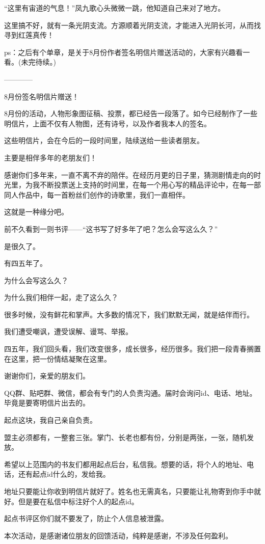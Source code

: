 \begin{this_body}
“这里有宙道的气息！”凤九歌心头微微一跳，他知道自己来对了地方。

这里搞不好，就有一条光阴支流。方源顺着光阴支流，才能进入光阴长河，从而找寻到红莲真传！

ps：之后有个单章，是关于8月份作者签名明信片赠送活动的，大家有兴趣看一看。(未完待续。)

------------

8月份签名明信片赠送！

8月份的活动，人物形象图征稿、投票，都已经告一段落了。如今已经制作了一些明信片，上面不仅有人物图，还有诗号，以及作者我本人的签名。

这些明信片，会在今后的一段时间里，陆续送给一些读者朋友。

主要是相伴多年的老朋友们！

感谢你们多年来，一直不离不弃的陪伴。在经历月更的日子里，猜测剧情走向的时光里，为我不断投票送上支持的时间里，在每一个用心写的精品评论中，在每一部同人作品中，每一首粉丝们创作的诗歌里，我们一直相伴。

这就是一种缘分吧。

前不久看到一则书评——“这书写了好多年了吧？怎么会写这么久？”

是很久了。

有四五年了。

为什么会写这么久？

为什么我们相伴一起，走了这么久？

很多时候，没有鲜花和掌声。大多数的情况下，我们默默无闻，就是结伴而行。

我们遭受嘲讽，遭受误解、谩骂、举报。

四五年，我们回头看，我们改变很多，成长很多，经历很多。我们把一段青春搁置在这里，把一份情结凝聚在这里。

谢谢你们，亲爱的朋友们。

QQ群、贴吧群、微信，都会有专门的人负责沟通。届时会询问id、电话、地址。毕竟是要寄明信片出去的。

起点这块，我自己亲自负责。

盟主必须都有，一整套三张。掌门、长老也都有份，分别是两张，一张，随机发放。

希望以上范围内的书友们都用起点后台，私信我。想要的话，将个人的地址、电话，还有起点id什么的，发给我。

地址只要能让你收到明信片就好了。姓名也无需真名，只要能让礼物寄到你手中就好。但是要在私信中标注好个人的起点id。

起点书评区你们就不要发了，防止个人信息被泄露。

本次活动，是感谢诸位朋友的回馈活动，纯粹是感谢，不涉及任何盈利。


\end{this_body}
